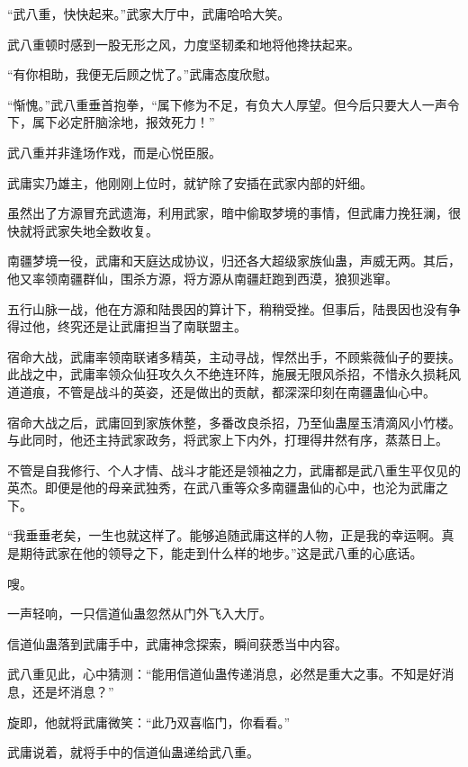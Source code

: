 
\begin{this_body}

“武八重，快快起来。”武家大厅中，武庸哈哈大笑。

武八重顿时感到一股无形之风，力度坚韧柔和地将他搀扶起来。

“有你相助，我便无后顾之忧了。”武庸态度欣慰。

“惭愧。”武八重垂首抱拳，“属下修为不足，有负大人厚望。但今后只要大人一声令下，属下必定肝脑涂地，报效死力！”

武八重并非逢场作戏，而是心悦臣服。

武庸实乃雄主，他刚刚上位时，就铲除了安插在武家内部的奸细。

虽然出了方源冒充武遗海，利用武家，暗中偷取梦境的事情，但武庸力挽狂澜，很快就将武家失地全数收复。

南疆梦境一役，武庸和天庭达成协议，归还各大超级家族仙蛊，声威无两。其后，他又率领南疆群仙，围杀方源，将方源从南疆赶跑到西漠，狼狈逃窜。

五行山脉一战，他在方源和陆畏因的算计下，稍稍受挫。但事后，陆畏因也没有争得过他，终究还是让武庸担当了南联盟主。

宿命大战，武庸率领南联诸多精英，主动寻战，悍然出手，不顾紫薇仙子的要挟。此战之中，武庸率领众仙狂攻久久不绝连环阵，施展无限风杀招，不惜永久损耗风道道痕，不管是战斗的英姿，还是做出的贡献，都深深印刻在南疆蛊仙心中。

宿命大战之后，武庸回到家族休整，多番改良杀招，乃至仙蛊屋玉清滴风小竹楼。与此同时，他还主持武家政务，将武家上下内外，打理得井然有序，蒸蒸日上。

不管是自我修行、个人才情、战斗才能还是领袖之力，武庸都是武八重生平仅见的英杰。即便是他的母亲武独秀，在武八重等众多南疆蛊仙的心中，也沦为武庸之下。

“我垂垂老矣，一生也就这样了。能够追随武庸这样的人物，正是我的幸运啊。真是期待武家在他的领导之下，能走到什么样的地步。”这是武八重的心底话。

嗖。

一声轻响，一只信道仙蛊忽然从门外飞入大厅。

信道仙蛊落到武庸手中，武庸神念探索，瞬间获悉当中内容。

武八重见此，心中猜测：“能用信道仙蛊传递消息，必然是重大之事。不知是好消息，还是坏消息？”

旋即，他就将武庸微笑：“此乃双喜临门，你看看。”

武庸说着，就将手中的信道仙蛊递给武八重。


\end{this_body}
